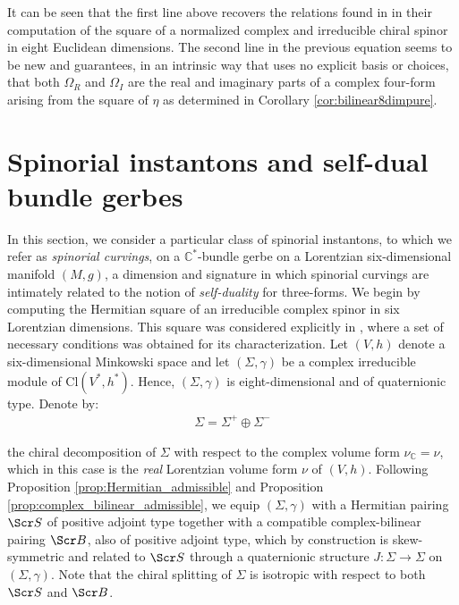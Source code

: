 \documentclass[10pt,a4paper,twoside,reqno]{amsart}
\theoremstyle{plain}
\theoremstyle{definition}
\theoremstyle{remark}
\def\C{\mathbb{C}}
\def\scB{\Scr B}
\def\scS{\Scr S}
\def\Cl{\mathrm{Cl}}
\begin{document}
\noindent
It can be seen that the first line above recovers the relations found in \cite[Section 3.7]{Krasnov2024} in their computation of the square of a normalized complex and irreducible chiral spinor in eight Euclidean dimensions. The second line in the previous equation seems to be new and guarantees, in an intrinsic way that uses no explicit basis or choices, that both $\Omega_R$ and $\Omega_I$ are the real and imaginary parts of a complex four-form arising from the square of $\eta$ as determined in Corollary \ref{cor:bilinear8dimpure}.


\section{Spinorial instantons and self-dual bundle gerbes}
\label{section:SDGerbe}


In this section, we consider a particular class of spinorial instantons, to which we refer as \emph{spinorial curvings}, on a $\mathbb{C}^{\ast}$-bundle gerbe on a Lorentzian six-dimensional manifold $(M,g)$, a dimension and signature in which spinorial curvings are intimately related to the notion of \emph{self-duality} for three-forms. We begin by computing the Hermitian square of an irreducible complex spinor in six Lorentzian dimensions. This square was considered explicitly in \cite{Figueroa_Lorentzian_6d_2018}, where a set of necessary conditions was obtained for its characterization. Let $(V,h)$ denote a six-dimensional Minkowski space and let $(\Sigma , \gamma)$ be a complex irreducible module of $\Cl(V^{\ast},h^{\ast})$. Hence, $(\Sigma , \gamma)$ is eight-dimensional and of quaternionic type. Denote by: 
\begin{eqnarray*}
\Sigma = \Sigma^{+} \oplus \Sigma^{-}
\end{eqnarray*}

\noindent
the chiral decomposition of $\Sigma$ with respect to the complex volume form $\nu_{\C} = \nu$, which in this case is the \emph{real} Lorentzian volume form $\nu$ of $(V,h)$. Following Proposition \ref{prop:Hermitian_admissible} and Proposition \ref{prop:complex_bilinear_admissible}, we equip $(\Sigma,\gamma)$ with a Hermitian pairing $\scS$ of positive adjoint type together with a compatible complex-bilinear pairing $\scB$, also of positive adjoint type, which by construction is skew-symmetric and related to $\scS$ through a quaternionic structure $J \colon \Sigma \to \Sigma$ on $(\Sigma , \gamma)$. Note that the chiral splitting of $\Sigma$ is isotropic with respect to both $\scS$ and $\scB$. 
\end{document}
